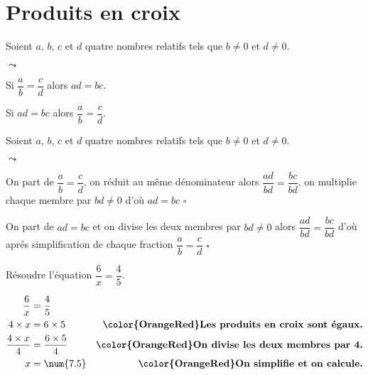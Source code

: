 \section{Produits en croix}
\begin{propriete}
Soient $a$, $b$, $c$ et $d$ quatre nombres relatifs tels que $b\neq 0$ et $d\neq 0$.
    \begin{list}{$\leadsto$}{}
        \item Si $\dfrac{a}{b}=\dfrac{c}{d}$ alors $ad=bc$.
        \item Si $ad=bc$ alors $\dfrac{a}{b}=\dfrac{c}{d}$.
    \end{list}
\end{propriete}


\begin{preuve}
Soient $a$, $b$, $c$ et $d$ quatre nombres relatifs tels que $b\neq 0$ et $d\neq 0$.\\
    \begin{list}{$\leadsto$}{}
        \item On part de $\dfrac{a}{b}=\dfrac{c}{d}$, on réduit au même dénominateur alors $\dfrac{ad}{bd}=\dfrac{bc}{bd}$, on multiplie chaque membre par $bd\neq 0$ 
        d'où $ad=bc$ $\square$
        \item On part de $ad=bc$ et on divise les deux membres par $bd\neq 0$ alors $\dfrac{ad}{bd}=\dfrac{bc}{bd}$ d'où aprés simplification de chaque fraction $\dfrac{a}{b}=\dfrac{c}{d}$ $\square$
    \end{list}
\end{preuve}

\begin{exemple*1}
    Résoudre l'équation $\dfrac{6}{x}=\dfrac{4}{5}$.\par\medskip
    \par\medskip
    \correction    
    \begin{align*}
    \dfrac{6}{x}        &=\dfrac{4}{5}           &\\
    4\times x           &= 6\times 5             &\text{\bfseries \color{OrangeRed}Les produits en croix sont égaux.}\\
    \dfrac{4\times x}{4}&= \dfrac{6\times 5}{4}  &\text{\bfseries \color{OrangeRed}On divise les deux membres par 4.}\\
    x                   &=\num{7.5}              &\text{\bfseries \color{OrangeRed}On simplifie et on calcule.}
    \end{align*}
\end{exemple*1}

